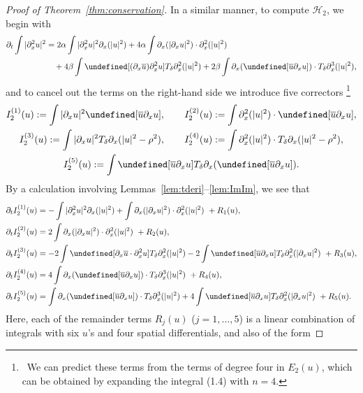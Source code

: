 \documentclass{amsart}
\numberwithin{equation}{section}
\newcommand{\Td}{T_{\delta}}
\let\Im=\undefined\DeclareMathOperator{\Im}{Im}
\begin{document}
\begin{proof}[Proof of Theorem~\ref{thm:conservation}]
In a similar manner, to compute $\mathcal{H}_2$, we begin with
\begin{align*}
\partial_t\int |\partial_x^2u|^2 &=2\alpha \int |\partial_x^2u|^2\partial_x(|u|^2) +4\alpha \int \partial_x(|\partial_xu|^2)\cdot \partial_x^2(|u|^2) \\
&\quad +4\beta \int \Im [(\partial_x\overline{u})\partial_x^2u] \Td \partial_x^2(|u|^2) +2\beta \int \partial_x(\Im[\overline{u}\partial_xu])\cdot \Td\partial_x^3(|u|^2) ,
\end{align*}
and to cancel out the terms on the right-hand side we introduce five correctors%
\footnote{~We can predict these terms from the terms of degree four in $E_2(u)$, which can be obtained by expanding the integral (1.4) with $n=4$.}%
\begin{gather*}
I_2^{(1)}(u):=\int |\partial_xu|^2\Im[\overline{u}\partial_xu] ,\qquad
I_2^{(2)}(u):=\int \partial_x^2(|u|^2)\cdot \Im[\overline{u}\partial_xu] ,\\
I_2^{(3)}(u):=\int |\partial_xu|^2\Td\partial_x(|u|^2-\rho^2) ,\qquad
I_2^{(4)}(u):=\int \partial_x^2(|u|^2)\cdot \Td\partial_x(|u|^2-\rho^2) ,\\
I_2^{(5)}(u):=\int \Im[\overline{u}\partial_xu]\Td\partial_x(\Im[\overline{u}\partial_xu]) .
\end{gather*}
By a calculation involving Lemmas~\ref{lem:tderi}--\ref{lem:ImIm}, we see that
\begin{align*}
\partial_tI_2^{(1)}(u)&= -\int |\partial_x^2u|^2\partial_x(|u|^2) +\int \partial_x(|\partial_xu|^2)\cdot \partial_x^2(|u|^2) \ +R_1(u),\\
\partial_tI_2^{(2)}(u)&=2\int \partial_x(|\partial_xu|^2)\cdot \partial_x^2(|u|^2) \ +R_2(u) ,\\
\partial_tI_2^{(3)}(u)&=-2\int \Im[\partial_x\overline{u}\cdot \partial_x^2u]\Td\partial_x^2(|u|^2) -2\int \Im[\overline{u}\partial_xu]\Td\partial_x^2(|\partial_xu|^2) \ +R_3(u),\\
\partial_tI_2^{(4)}(u)&=4\int \partial_x(\Im[\overline{u}\partial_xu])\cdot \Td\partial_x^3(|u|^2) \ +R_4(u),\\
\partial_tI_2^{(5)}(u)&=\int \partial_x(\Im[\overline{u}\partial_xu])\cdot \Td\partial_x^3(|u|^2) +4\int \Im[\overline{u}\partial_xu]\Td\partial_x^2(|\partial_xu|^2) \ +R_5(u).
\end{align*}
Here, each of the remainder terms $R_j(u)$ ($j=1,\dots,5$) is a linear combination of integrals with six $u$'s and four spatial differentials, and also of the form 

\end{proof}
\end{document}
